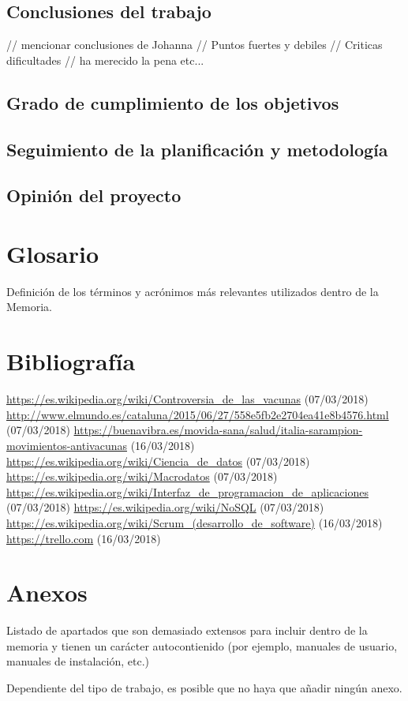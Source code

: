 \documentclass[11pt,a4paper]{article}
\begin{document}
\subsection{Conclusiones del trabajo}
// mencionar conclusiones de Johanna
// Puntos fuertes y debiles
// Criticas dificultades
// ha merecido la pena etc...

\subsection{Grado de cumplimiento de los objetivos}

\subsection{Seguimiento de la planificación y metodología}

\subsection{Opinión del proyecto}
\newpage 


\section{Glosario}
Definición de los términos y acrónimos más relevantes utilizados dentro de la Memoria. 
\newpage 


\section{Bibliografía}
\begin{thebibliography}{0}
   \url{https://es.wikipedia.org/wiki/Controversia_de_las_vacunas} (07/03/2018)
   \url{http://www.elmundo.es/cataluna/2015/06/27/558e5fb2e2704ea41e8b4576.html} (07/03/2018)
   \url{https://buenavibra.es/movida-sana/salud/italia-sarampion-movimientos-antivacunas} (16/03/2018)
   \url{https://es.wikipedia.org/wiki/Ciencia_de_datos} (07/03/2018)
   \url{https://es.wikipedia.org/wiki/Macrodatos} (07/03/2018)
   \url{https://es.wikipedia.org/wiki/Interfaz_de_programacion_de_aplicaciones} (07/03/2018)
   \url{https://es.wikipedia.org/wiki/NoSQL} (07/03/2018)
   \url{https://es.wikipedia.org/wiki/Scrum_(desarrollo_de_software)} (16/03/2018)
   \url{https://trello.com} (16/03/2018)
\end{thebibliography}
\newpage 


\section{Anexos}
Listado de apartados que son demasiado extensos para incluir dentro de la memoria y tienen un carácter autocontienido (por ejemplo, manuales de usuario, manuales de instalación, etc.) 

Dependiente del tipo de trabajo, es posible que no haya que añadir ningún anexo.
\end{document}
